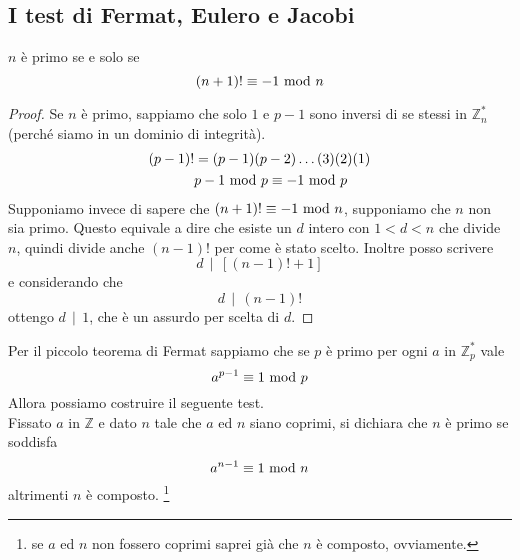 \subsection{I test di Fermat, Eulero e Jacobi}
\begin{teorema}
	$n$ è primo se e solo se 
	\begin{equation*}
	(n+1)!\equiv-1\ \mathrm{mod}\ n
	\end{equation*}
\end{teorema}
\begin{proof}
	Se $n$ è primo, sappiamo che solo $1$ e $p-1$ sono inversi di se stessi in $\mathbb{Z}_n^*$ (perché siamo in un dominio di integrità).
	\begin{align*}
	(p-1)!&=(p-1)(p-2)\dots(3)(2)(1)\\
	&p-1\ \mathrm{mod}\ p\equiv -1\ \mathrm{mod}\ p
	\end{align*}
	Supponiamo invece di sapere che $(n+1)!\equiv-1\ \mathrm{mod}\ n$, supponiamo che $n$ non sia primo. Questo equivale a dire che esiste un $d$ intero con $1<d<n$ che divide $n$, quindi divide anche $(n-1)!$ per come è stato scelto. Inoltre posso scrivere
	\begin{equation*}
	d \, \mid \, [(n-1)!+1]
	\end{equation*}
	e considerando che 
	\begin{equation*}
	d \, \mid \, (n-1)!
	\end{equation*}
	ottengo $d \, \mid \, 1$, che è un assurdo per scelta di $d$.
\end{proof}
\begin{teorema}
	Per il piccolo teorema di Fermat sappiamo che se $p$ è primo per ogni $a$ in $\mathbb{Z}_p^*$ vale 
	\begin{equation*}
	a^{p-1}\equiv1\ \mathrm{mod}\ p
	\end{equation*}
	Allora possiamo costruire il seguente test. \\ Fissato $a$ in $\mathbb{Z}$ e dato $n$ tale che $a$ ed $n$ siano coprimi, si dichiara che $n$ è primo se soddisfa 
	\begin{equation*}
	a^{n-1}\equiv1\ \mathrm{mod}\ n
	\end{equation*}
	altrimenti $n$ è composto. \footnote{se $a$ ed $n$ non fossero coprimi saprei già che $n$ è composto, ovviamente.}
\end{teorema}
